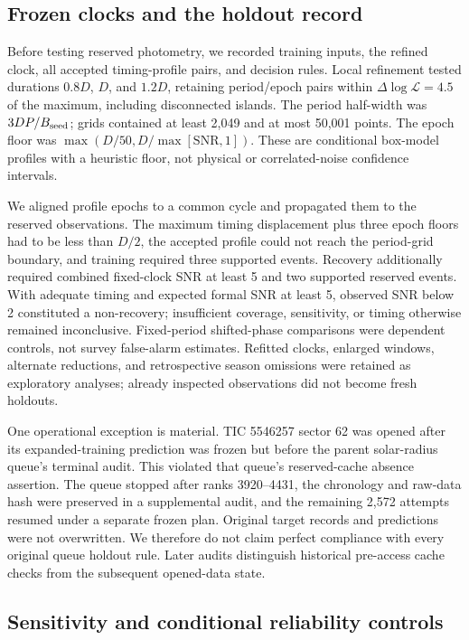 \subsection{Frozen clocks and the holdout record}

Before testing reserved photometry, we recorded training inputs, the refined
clock, all accepted timing-profile pairs, and decision rules. Local refinement
tested durations $0.8D$, $D$, and $1.2D$, retaining period/epoch pairs within
$\Delta\log\mathcal{L}=4.5$ of the maximum, including disconnected islands.
The period half-width was $3DP/B_{\rm seed}$; grids contained at least
2,049 and at most 50,001 points. The epoch floor was
$\max(D/50,D/\max[\mathrm{SNR},1])$.
These are conditional box-model profiles with a heuristic floor, not
physical or correlated-noise confidence intervals.

We aligned profile epochs to a common cycle and propagated them to the
reserved observations. The maximum timing displacement plus three epoch
floors had to be less than $D/2$, the accepted profile could not reach
the period-grid boundary, and training required three supported events.
Recovery additionally required combined fixed-clock SNR at least 5 and
two supported reserved events. With adequate timing and expected formal
SNR at least 5, observed SNR below 2 constituted a non-recovery; insufficient
coverage, sensitivity, or timing otherwise remained inconclusive.
Fixed-period shifted-phase comparisons were dependent controls, not survey
false-alarm estimates. Refitted clocks, enlarged windows, alternate reductions,
and retrospective season omissions were retained as exploratory analyses;
already inspected observations did not become fresh holdouts.

One operational exception is material. TIC 5546257 sector 62 was opened
after its expanded-training prediction was frozen but before the parent
solar-radius queue's terminal audit. This violated that queue's reserved-cache
absence assertion. The queue stopped after ranks 3920--4431, the chronology
and raw-data hash were preserved in a supplemental audit, and the remaining
2,572 attempts resumed under a separate frozen plan. Original target records
and predictions were not overwritten. We therefore do not claim perfect
compliance with every original queue holdout rule. Later audits distinguish
historical pre-access cache checks from the subsequent opened-data state.

\subsection{Sensitivity and conditional reliability controls}

